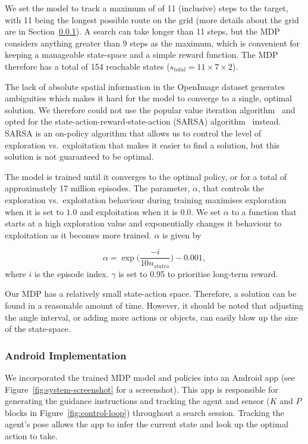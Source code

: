 \documentclass[a4paper, twoside]{article}
\begin{document}
We set the model to track a maximum of of 11 (inclusive) steps to the target, with 11 being the longest possible route on the grid (more details about the grid are in Section~\ref{sec:system-implementation}). A search can take longer than 11 steps, but the MDP considers anything greater than 9 steps as the maximum, which is convenient for keeping a manageable state-space and a simple reward function. The MDP therefore has a total of 154 reachable states ($s_{total}=11\times7\times2$).

The lack of absolute spatial information in the OpenImage dataset generates ambiguities which makes it hard for the model to converge to a single, optimal solution. We therefore could not use the popular value iteration algorithm~\cite{bellman1957markovian} and opted for the state-action-reward-state-action (SARSA) algorithm~\cite{rummery1994line} instead. SARSA is an on-policy algorithm that allows us to control the level of exploration vs.\ exploitation that makes it easier to find a solution, but this solution is not guaranteed to be optimal. 

The model is trained until it converges to the optimal policy, or for a total of approximately 17 million episodes. The parameter, $\alpha$, that controls the exploration vs.\ exploitation behaviour during training maximises exploration when it is set to $1.0$ and exploitation when it is $0.0$. We set $\alpha$ to a function that starts at a high exploration value and exponentially changes it behaviour to exploitation as it becomes more trained. $\alpha$ is given by 

\begin{equation}
  \alpha = \exp\Big(\frac{-i}{10n_{states}}\Big) - 0.001,
\end{equation}
where $i$ is the episode index.  $\gamma$ is set to 0.95 to prioritise long-term reward. 

Our MDP has a relatively small state-action space. Therefore, a solution can be found in a reasonable amount of time. However, it should be noted that adjusting the angle interval, or adding more actions or objects, can easily blow up the size of the state-space. 

\subsubsection{Android Implementation}\label{sec:system-implementation}

We incorporated the trained MDP model and policies into an Android app (see Figure~\ref{fig:system-screenshot} for a screenshot). This app is responsible for generating the guidance instructions and tracking the agent and sensor ($K$ and $P$ blocks in Figure~\ref{fig:control-loop}) throughout a search session. Tracking the agent's pose allows the app to infer the current state and look up the optimal action to take. 
\end{document}
